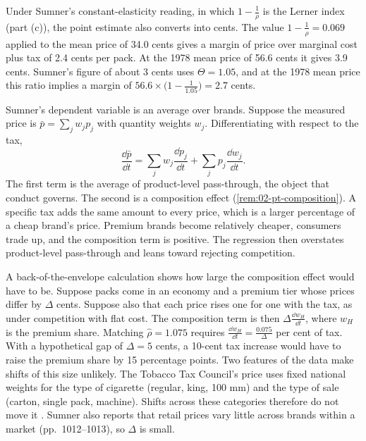 Under Sumner's constant-elasticity reading, in which $1 - \frac{1}{\rho}$ is the Lerner index (part (c)), the point
estimate also converts into cents. The value $1 - \frac{1}{\hat\rho} = 0.069$ applied to the mean price of 34.0 cents
gives a margin of price over marginal cost plus tax of 2.4 cents per pack. At the 1978 mean price
of 56.6 cents it gives 3.9 cents. Sumner's figure of about 3 cents uses $\Theta = 1.05$, and at the 1978 mean price
this ratio implies a margin of $56.6\times\big(1 - \frac{1}{1.05}\big) = 2.7$ cents.

Sumner's dependent variable is an average over brands. Suppose the measured price is $\bar p = \sum_j w_jp_j$ with
quantity weights $w_j$. Differentiating with respect to the tax,
\begin{equation}\label{eq:C-composition}
\frac{\dd\bar p}{\dd t} = \sum_j w_j\frac{\dd p_j}{\dd t} + \sum_j p_j\frac{\dd w_j}{\dd t} .
\end{equation}
The first term is the average of product-level pass-through, the object that conduct governs. The second is a
composition effect (\cref{rem:02-pt-composition}). A specific tax adds the same amount to every price, which is a
larger percentage of a cheap brand's price. Premium brands become relatively cheaper, consumers trade up, and the
composition term is positive. The regression then overstates product-level pass-through and leans toward rejecting
competition.

A back-of-the-envelope calculation shows how large the composition effect would have to be. Suppose packs come in
an economy and a premium tier whose prices differ by $\Delta$ cents. Suppose also that each price rises one for one
with the tax, as under competition with flat cost. The composition term is then $\Delta\frac{\dd w_H}{\dd t}$, where $w_H$ is
the premium share. Matching $\hat\rho = 1.075$ requires $\frac{\dd w_H}{\dd t} = \frac{0.075}{\Delta}$ per cent of
tax. With a hypothetical gap of $\Delta = 5$ cents, a 10-cent tax increase would have to raise the premium share by
15 percentage points. Two features of the data make shifts of this size unlikely. The Tobacco Tax Council's price
uses fixed national weights for the type of cigarette (regular, king, 100 mm) and the type of sale (carton, single
pack, machine). Shifts across these categories therefore do not move it \citep[p.~1016]{Sumner1981}. Sumner also reports
that retail prices vary little across brands within a market (pp.~1012--1013), so $\Delta$ is small.

